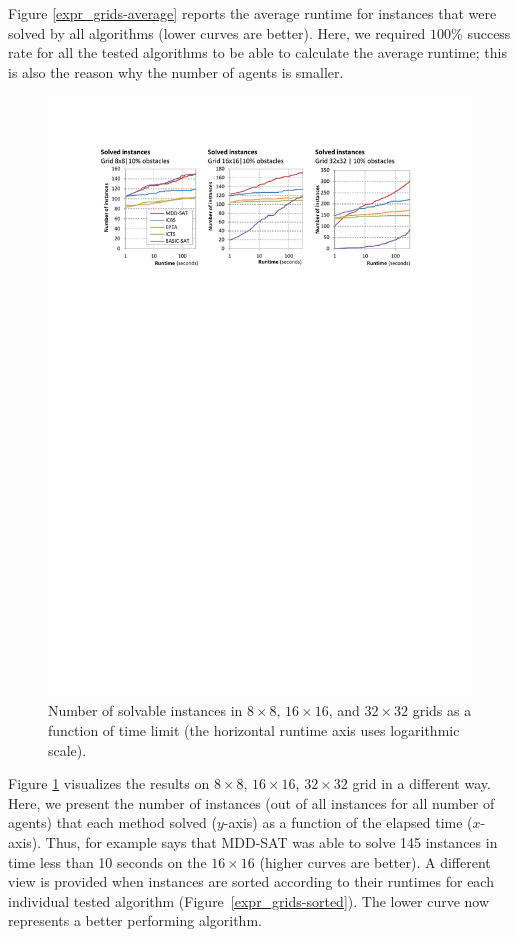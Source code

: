 \documentclass[jair,oneside,11pt]{article}
\begin{document}
Figure \ref{expr_grids-average} reports the average runtime for instances that were solved
by all algorithms (lower curves are better). Here, we required $100\%$ success
rate for all the tested algorithms to be able to calculate the average runtime;
this is also the reason why the number of agents is smaller.

\begin{figure}[t]
\centering
\includegraphics[trim={2.5cm 21.0cm 2.5cm 2.6cm},clip,width=\textwidth]{expr_grids-num-solved.pdf}
\vspace{-0.4cm}
\caption{Number of solvable instances in $8{}\times{}8$, $16{}\times{}16$, and $32{}\times{}32$ grids as a function of time limit (the horizontal runtime axis uses logarithmic scale).}
\label{expr_grids-num-solved}
\end{figure}

Figure \ref{expr_grids-num-solved} visualizes the results on $8{}\times{}8$, $16{}\times{}16$, $32{}\times{}32$ grid
in a different way. Here, we present the number of instances (out of all instances for all number of agents) that each method solved ($y$-axis) as a function of the elapsed time ($x$-axis). Thus, for example says that MDD-SAT was able to solve 145 instances in time less
than 10 seconds on the $16{}\times{}16$ (higher curves are better). A different view is provided when instances are sorted according to their runtimes for each individual tested algorithm (Figure~\ref{expr_grids-sorted}). The lower curve now represents a better performing algorithm.	
\end{document}

